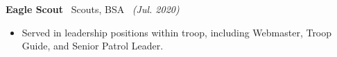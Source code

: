 \documentclass[class=article, crop=false]{standalone}
\begin{document}
\textbf{Eagle Scout} \textbar\ Scouts, BSA \hfill\ \textsl{(Jul. 2020)}
\begin{itemize}[leftmargin=*] 
    \item Served in leadership positions within troop, including 
          Webmaster, Troop Guide, and Senior Patrol Leader.
\end{itemize}
\end{document}

